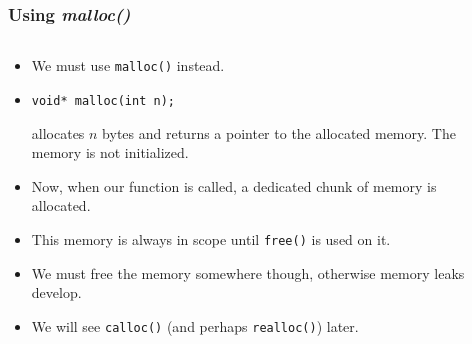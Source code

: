 
\begin{frame}[fragile]
\frametitle{Using {\em malloc()}}
\begin{columns}[T]

\begin{column}{0.55\textwidth}
\begin{itemize}[<+->]
\item We must use \verb^malloc()^ instead.
\item
\begin{verbatim}
void* malloc(int n);
\end{verbatim}
allocates $n$ bytes and returns a pointer to the allocated
memory. The memory is  not initialized.
\item Now, when our function is called, a dedicated chunk of memory is allocated.
\item This memory is always in scope until \verb^free()^ is used on it.
\item We must free the memory somewhere though, otherwise memory leaks develop.
\item We will see \verb^calloc()^ (and perhaps \verb^realloc()^) later.
\end{itemize}
\end{column}

\pause
\begin{column}{0.35\textwidth}

\end{column}

\end{columns}
\end{frame}


